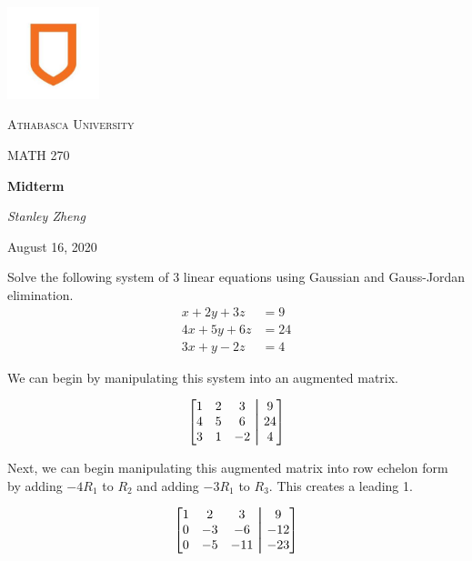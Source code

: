 \documentclass[11pt, letterpaper, twoside]{article}
\newcommand\aug{\fboxsep=-\fboxrule\!\!\!\fbox{\strut}\!\!\!} %
\begin{document}
\begin{titlepage}
	\centering
	\vspace*{60px}
	\hspace{0pt}
	\includegraphics[width=0.2\textwidth]{logo}\par\vspace{1cm}
	{\scshape\LARGE Athabasca University \par}
	\vspace{1cm}
	{\scshape\Large MATH 270\par}
	\vspace{1.5cm}
	{\huge\bfseries Midterm\par}
	\vspace{2cm}
	{\Large\itshape Stanley Zheng\par}
	\vfill
	{\large August 16, 2020\par}
	\vspace*{50px}
	\hspace{0pt}
\pagebreak
\end{titlepage}
\noindent Solve the following system of 3 linear equations using Gaussian and Gauss-Jordan elimination.
\begin{align*}
x+2y+3z&=9\\
4x+5y+6z&=24\\
3x+y-2z&=4
\end{align*}

\vspace{0.5cm}

\noindent We can begin by manipulating this system into an augmented matrix.

\[\begin{bmatrix}
1 & 2 & 3 & \aug & 9\\
4 & 5 & 6 & \aug & 24\\
3 & 1 & -2 & \aug & 4
\end{bmatrix}\]

\noindent Next, we can begin manipulating this augmented matrix into row echelon form by adding \(-4R_1\) to \(R_2\) and adding \(-3R_1\) to \(R_3\). This creates a leading 1.

\[\begin{bmatrix}
1 & 2 & 3 & \aug & 9\\
0 & -3 & -6 & \aug & -12\\
0 & -5& -11 & \aug & -23
\end{bmatrix}\]
\end{document}
